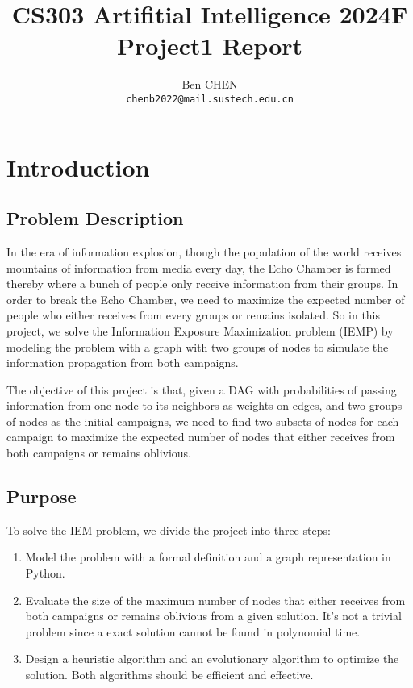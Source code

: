 \documentclass{article}
\title{\textbf{CS303 Artifitial Intelligence 2024F Project1 Report}}
\author{Ben CHEN \\ \texttt{chenb2022@mail.sustech.edu.cn}}
\begin{document}
\maketitle

\section{Introduction}

\subsection{Problem Description}

In the era of information explosion, though the population of the world receives mountains of information from media every day, the Echo Chamber is formed thereby where a bunch of people only receive information from their groups. In order to break the Echo Chamber, we need to maximize the expected number of people who either receives from every groups or remains isolated. So in this project, we solve the Information Exposure Maximization problem (IEMP) by modeling the problem with a graph with two groups of nodes to simulate the information propagation from both campaigns.

The objective of this project is that, given a DAG with probabilities of passing information from one node to its neighbors as weights on edges, and two groups of nodes as the initial campaigns, we need to find two subsets of nodes for each campaign to maximize the expected number of nodes that either receives from both campaigns or remains oblivious.

\subsection{Purpose}

To solve the IEM problem, we divide the project into three steps:
\begin{enumerate}
    \item Model the problem with a formal definition and a graph representation in Python.
    \item Evaluate the size of the maximum number of nodes that either receives from both campaigns or remains oblivious from a given solution. It's not a trivial problem since a exact solution cannot be found in polynomial time.
    \item Design a heuristic algorithm and an evolutionary algorithm to optimize the solution. Both algorithms should be efficient and effective.
\end{enumerate}
\end{document}
